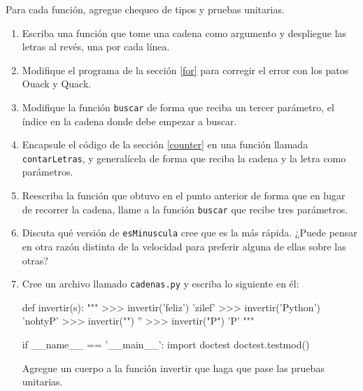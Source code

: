 Para cada función, agregue chequeo de tipos y pruebas unitarias.
\begin{enumerate}
\item Escriba una función que tome una cadena como argumento y despliegue
las letras al revés, una por cada línea.
\item Modifique el programa de la sección \ref{for} para corregir el error
con los patos Ouack y Quack.
\item Modifique la función \texttt{buscar} de forma que reciba un tercer
parámetro, el índice en la cadena donde debe empezar a buscar.
\item Encapsule el código de la sección \ref{counter} en una función llamada
\texttt{contarLetras}, y generalícela de forma que reciba la cadena
y la letra como parámetros.
\item Reescriba la función que obtuvo en el punto anterior de forma que
en lugar de recorrer la cadena, llame a la función \texttt{buscar}
que recibe tres parámetros.
\item Discuta qué versión de \texttt{esMinuscula} cree que es la más rápida.
¿Puede pensar en otra razón distinta de la velocidad para preferir
alguna de ellas sobre las otras?
\item Cree un archivo llamado \verb+cadenas.py+ y escriba lo siguiente
en él:

\begin{pythoncode}
  def invertir(s):
    """
      >>> invertir('feliz')
      'zilef'
      >>> invertir('Python')
      'nohtyP'
      >>> invertir("")
      ''
      >>> invertir("P")
      'P'
    """

  if __name__ == '__main__':
    import doctest
    doctest.testmod()
\end{pythoncode}
 Agregue un cuerpo a la función invertir que haga que pase las pruebas
unitarias.


\end{enumerate}
